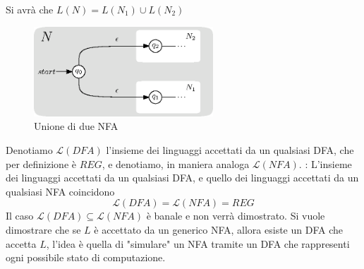 \documentclass[10pt, letterpaper]{report}
\begin{document}
Si avrà che $L(N)=L(N_1)\cup L(N_2)$\begin{center}
    \begin{figure}[h!]
        \centering 
        \includegraphics[width=0.6\textwidth ]{images/UnioneNFA.eps}
        \caption{Unione di due NFA}
        \label{fig:NFAUnion}
    \end{figure}
\end{center}
Denotiamo $\mathcal{L}(DFA)$ l'insieme dei linguaggi accettati da un qualsiasi DFA, che per definizione è $REG$, e denotiamo, in maniera analoga 
$\mathcal{L}(NFA)$. \acc 
\teo{} : L'insieme dei linguaggi accettati da un qualsiasi DFA, e quello dei linguaggi accettati 
da un qualsiasi NFA coincidono $$\mathcal{L}(DFA)=\mathcal{L}(NFA)=REG$$
\dimo{} Il caso $\mathcal{L}(DFA)\subseteq\mathcal{L}(NFA)$ è banale e non verrà dimostrato. Si vuole dimostrare che 
se $L$ è accettato da un generico NFA, allora esiste un DFA che accetta $L$, l'idea è quella di "simulare" un NFA 
tramite un DFA che rappresenti ogni possibile stato di computazione.
\end{document}
